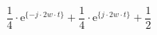 \correct
\[
\frac{1}{4}\cdot
\textrm{e}^{\{-j \cdot 2w \cdot t \}}
+
\frac{1}{4}\cdot
\textrm{e}^{\{ j \cdot 2w \cdot t \}}
+
\frac{1}{2}
\]
